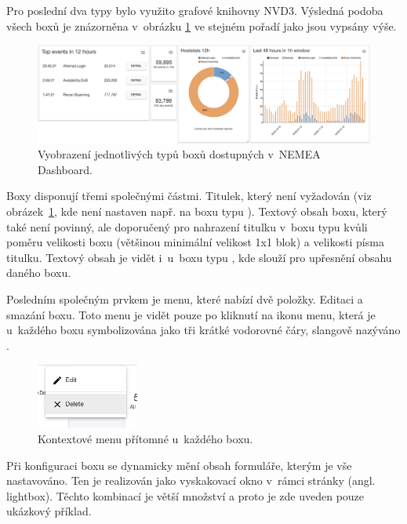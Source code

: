 Pro poslední dva typy bylo využito grafové knihovny NVD3. Výsledná podoba všech boxů je znázorněna v~obrázku \ref{fig:boxes} ve stejném pořadí jako jsou vypsány výše.

\begin{figure}[ht]
    \centering
    \includegraphics[width=\textwidth]{fig/boxes.png}
    \caption{Vyobrazení jednotlivých typů boxů dostupných v~NEMEA Dashboard.} \label{fig:boxes}
\end{figure}

Boxy disponují třemi společnými částmi. Titulek, který není vyžadován (viz obrázek~\ref{fig:boxes}, kde není nastaven např. na boxu typu ). Textový obsah boxu, který také není povinný, ale doporučený pro nahrazení titulku v~boxu typu  kvůli poměru velikosti boxu (většinou minimální velikost 1x1 blok) a velikosti písma titulku. Textový obsah je vidět i~u~boxu typu , kde slouží pro upřesnění obsahu daného boxu.

Posledním společným prvkem je menu, které nabízí dvě položky. Editaci a smazání boxu. Toto menu je vidět pouze po kliknutí na ikonu menu, která je u~každého boxu symbolizována jako tři krátké vodorovné čáry, slangově nazýváno .

\begin{figure}[ht]
    \centering
    \includegraphics[width=0.3\textwidth]{fig/box_menu.png}
    \caption{Kontextové menu přítomné u~každého boxu.} \label{fig:box_menu}
\end{figure}

Při konfiguraci boxu se dynamicky mění obsah formuláře, kterým je vše nastavováno. Ten je realizován jako vyskakovací okno v~rámci stránky (angl. lightbox). Těchto kombinací je větší množství a proto je zde uveden pouze ukázkový příklad.

